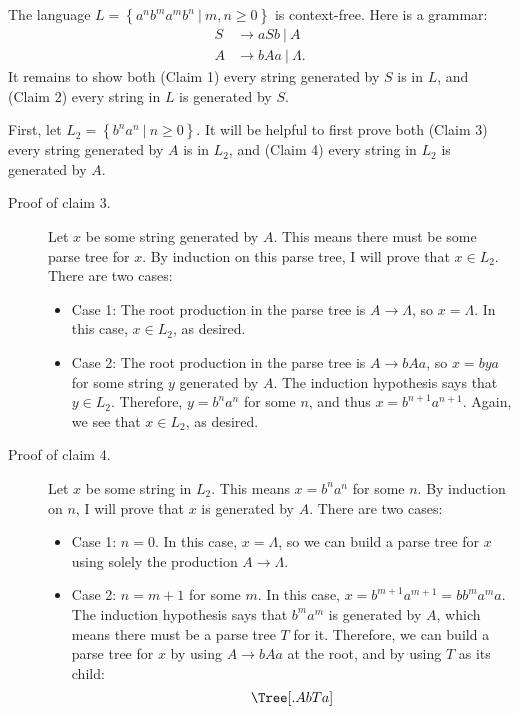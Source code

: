 \documentclass[12pt]{article}
\newcommand{\alt}{\ |\ }
\newcommand{\set}[1]{\left\{#1\right\}}
\newcommand{\Set}[2]{\set{#1\ |\ #2}}
\begin{document}
    The language $L=\Set{a^nb^ma^mb^n}{m,n\geq0}$ is context-free. Here is a grammar:
    \begin{align*}
      S &\to aSb \alt A \\
      A &\to bAa \alt \Lambda.
    \end{align*}
    It remains to show both (Claim 1) every string generated by $S$ is in $L$, and (Claim 2) every string in $L$ is generated by $S$.

    First, let $L_2=\Set{b^na^n}{n\geq0}$. It will be helpful to first prove both (Claim 3) every string generated by $A$ is in $L_2$, and (Claim 4) every string in $L_2$ is generated by $A$.
    \begin{description}
      \item[Proof of claim 3.]
        Let $x$ be some string generated by $A$. This means there must be some parse tree for $x$. By induction on this parse tree, I will prove that $x\in L_2$. There are two cases:
        \begin{itemize}
          \item
            Case 1: The root production in the parse tree is $A\to\Lambda$, so $x=\Lambda$. In this case, $x\in L_2$, as desired.
          \item
            Case 2: The root production in the parse tree is $A\to bAa$, so $x=bya$ for some string $y$ generated by $A$. The induction hypothesis says that $y\in L_2$. Therefore, $y=b^na^n$ for some $n$, and thus $x=b^{n+1}a^{n+1}$. Again, we see that $x\in L_2$, as desired.
        \end{itemize}
      \item[Proof of claim 4.]
        Let $x$ be some string in $L_2$. This means $x=b^na^n$ for some $n$. By induction on $n$, I will prove that $x$ is generated by $A$. There are two cases:
        \begin{itemize}
          \item
            Case 1: $n=0$. In this case, $x=\Lambda$, so we can build a parse tree for $x$ using solely the production $A\to\Lambda$.
          \item
            Case 2: $n=m+1$ for some $m$. In this case, $x=b^{m+1}a^{m+1}=bb^ma^ma$. The induction hypothesis says that $b^ma^m$ is generated by $A$, which means there must be a parse tree $T$ for it. Therefore, we can build a parse tree for $x$ by using $A\to bAa$ at the root, and by using $T$ as its child:
            \[
              \Tree[.A b T a ]
            \]
        \end{itemize}

\end{description}
\end{document}
